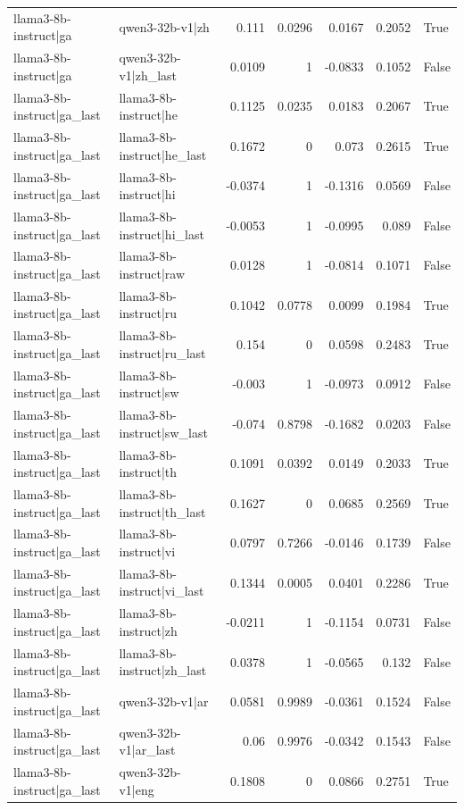 \begin{table}
\begin{tabular}{l l r r r r l}
llama3-8b-instruct|ga & qwen3-32b-v1|zh & 0.111 & 0.0296 & 0.0167 & 0.2052 & True \\
llama3-8b-instruct|ga & qwen3-32b-v1|zh_last & 0.0109 & 1 & -0.0833 & 0.1052 & False \\
llama3-8b-instruct|ga_last & llama3-8b-instruct|he & 0.1125 & 0.0235 & 0.0183 & 0.2067 & True \\
llama3-8b-instruct|ga_last & llama3-8b-instruct|he_last & 0.1672 & 0 & 0.073 & 0.2615 & True \\
llama3-8b-instruct|ga_last & llama3-8b-instruct|hi & -0.0374 & 1 & -0.1316 & 0.0569 & False \\
llama3-8b-instruct|ga_last & llama3-8b-instruct|hi_last & -0.0053 & 1 & -0.0995 & 0.089 & False \\
llama3-8b-instruct|ga_last & llama3-8b-instruct|raw & 0.0128 & 1 & -0.0814 & 0.1071 & False \\
llama3-8b-instruct|ga_last & llama3-8b-instruct|ru & 0.1042 & 0.0778 & 0.0099 & 0.1984 & True \\
llama3-8b-instruct|ga_last & llama3-8b-instruct|ru_last & 0.154 & 0 & 0.0598 & 0.2483 & True \\
llama3-8b-instruct|ga_last & llama3-8b-instruct|sw & -0.003 & 1 & -0.0973 & 0.0912 & False \\
llama3-8b-instruct|ga_last & llama3-8b-instruct|sw_last & -0.074 & 0.8798 & -0.1682 & 0.0203 & False \\
llama3-8b-instruct|ga_last & llama3-8b-instruct|th & 0.1091 & 0.0392 & 0.0149 & 0.2033 & True \\
llama3-8b-instruct|ga_last & llama3-8b-instruct|th_last & 0.1627 & 0 & 0.0685 & 0.2569 & True \\
llama3-8b-instruct|ga_last & llama3-8b-instruct|vi & 0.0797 & 0.7266 & -0.0146 & 0.1739 & False \\
llama3-8b-instruct|ga_last & llama3-8b-instruct|vi_last & 0.1344 & 0.0005 & 0.0401 & 0.2286 & True \\
llama3-8b-instruct|ga_last & llama3-8b-instruct|zh & -0.0211 & 1 & -0.1154 & 0.0731 & False \\
llama3-8b-instruct|ga_last & llama3-8b-instruct|zh_last & 0.0378 & 1 & -0.0565 & 0.132 & False \\
llama3-8b-instruct|ga_last & qwen3-32b-v1|ar & 0.0581 & 0.9989 & -0.0361 & 0.1524 & False \\
llama3-8b-instruct|ga_last & qwen3-32b-v1|ar_last & 0.06 & 0.9976 & -0.0342 & 0.1543 & False \\
llama3-8b-instruct|ga_last & qwen3-32b-v1|eng & 0.1808 & 0 & 0.0866 & 0.2751 & True \\

\end{tabular}
\end{table}
